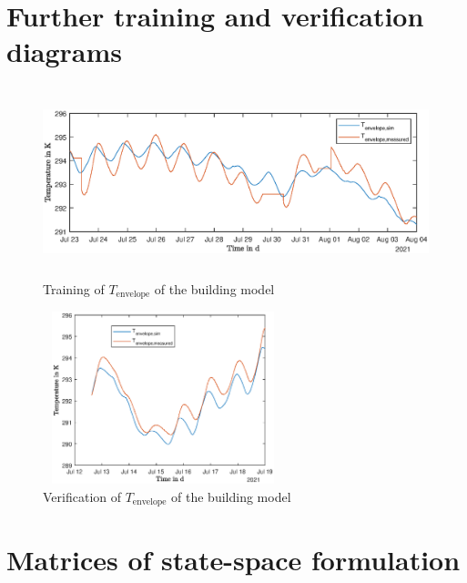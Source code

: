 \section{Further training and verification diagrams}
\label{sec:appendix:Modelvalues}
\begin{figure}[H]
            \centering
            \includegraphics[width=14cm,height=5.5cm]{figure/TrainingEnvelope.eps}
           \caption{Training of $T_\text{envelope}$ of the building model}
           \label{fig:trainingModelenvelope}
    \end{figure}
    \begin{figure}[H]
            \centering
            \includegraphics[width=7cm,height=5cm]{figure/ValidierungEnvelope.eps}
           \caption{Verification of $T_\text{envelope}$ of the building model}
           \label{fig:verificationModelenvelpe}
    \end{figure}
    
\section{Matrices of state-space formulation}
\label{sec:appendix:Matrizen}
    
